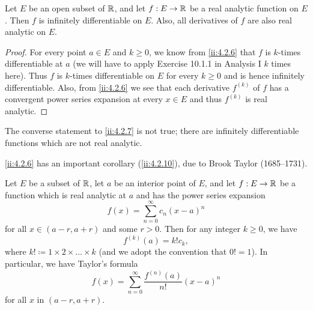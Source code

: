 \begin{cor}\label{ii:4.2.7}
  Let \(E\) be an open subset of \(\mathbb{R}\), and let \(f : E \to \mathbb{R}\) be a real analytic function on \(E\).
  Then \(f\) is infinitely differentiable on \(E\).
  Also, all derivatives of \(f\) are also real analytic on \(E\).
\end{cor}

\begin{proof}
  For every point \(a \in E\) and \(k \geq 0\), we know from \cref{ii:4.2.6} that \(f\) is \(k\)-times differentiable at \(a\)
  (we will have to apply Exercise 10.1.1 in Analysis I \(k\) times here).
  Thus \(f\) is \(k\)-times differentiable on \(E\) for every \(k \geq 0\) and is hence infinitely differentiable.
  Also, from \cref{ii:4.2.6} we see that each derivative \(f^{(k)}\) of \(f\) has a convergent power series expansion at every \(x \in E\) and thus \(f^{(k)}\) is real analytic.
\end{proof}

\setcounter{thm}{8}
\begin{rmk}\label{ii:4.2.9}
  The converse statement to \cref{ii:4.2.7} is not true;
  there are infinitely differentiable functions which are not real analytic.
\end{rmk}

\begin{note}
  \cref{ii:4.2.6} has an important corollary (\cref{ii:4.2.10}), due to Brook Taylor (1685--1731).
\end{note}

\begin{cor}\label{ii:4.2.10}
  Let \(E\) be a subset of \(\mathbb{R}\), let \(a\) be an interior point of \(E\), and let \(f : E \to \mathbb{R}\) be a function which is real analytic at \(a\) and has the power series expansion
  \[
    f(x) = \sum_{n = 0}^\infty c_n (x - a)^n
  \]
  for all \(x \in (a - r, a + r)\) and some \(r > 0\).
  Then for any integer \(k \geq 0\), we have
  \[
    f^{(k)}(a) = k! c_k,
  \]
  where \(k! \coloneqq 1 \times 2 \times \dots \times k\)
  (and we adopt the convention that \(0! = 1\)).
  In particular, we have Taylor's formula
  \[
    f(x) = \sum_{n = 0}^\infty \dfrac{f^{(n)}(a)}{n!} (x - a)^n
  \]
  for all \(x\) in \((a - r, a + r)\).
\end{cor}

